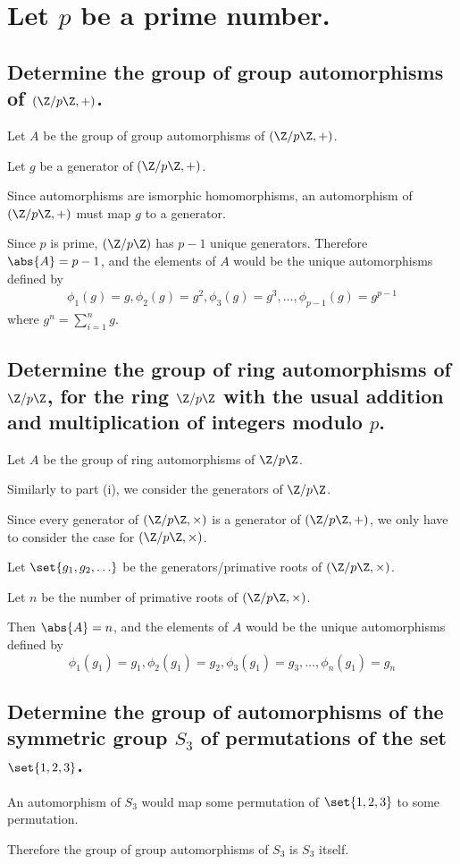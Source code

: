 \section[Problem 2]{Let $p$ be a prime number.
}  
    \subsection[(i)]{Determine the group of group automorphisms of $(\Z/p\Z, +)$.
    }
        Let $A$ be the group of group automorphisms of $(\Z/p\Z, +)$.

        Let $g$ be a generator of $(\Z/p\Z, +)$.

        Since automorphisms are ismorphic homomorphisms, an automorphism of $(\Z/p\Z, +)$ 
        must map $g$ to a generator.

        Since $p$ is prime, $(\Z/p\Z)$ has $p-1$ unique generators.
        Therefore $\abs{A} = p-1$,
        and the elements of $A$ would be the unique automorphisms defined by 
        \begin{align*}
            \phi_1(g) = g, \phi_2(g) = g^2, \phi_3(g) = g^3, \hdots, \phi_{p-1}(g) = g^{p-1}
        \end{align*}
        where $g^n = \sum_{i=1}^n g$.

    \subsection[(ii)]{Determine the group of ring automorphisms of $\Z/p\Z$, for the ring $\Z/p\Z$
        with the usual addition and multiplication of integers modulo $p$.
    }
        Let $A$ be the group of ring automorphisms of $\Z/p\Z$.

        Similarly to part (i), we consider the generators of $\Z/p\Z$.

        Since every generator of $(\Z/p\Z, \times)$ is a generator of $(\Z/p\Z, +)$,
        we only have to consider the case for $(\Z/p\Z, \times)$.

        Let $\set{g_1, g_2, \hdots}$ be the generators/primative roots of $(\Z/p\Z, \times)$.

        Let $n$ be the number of primative roots of $(\Z/p\Z, \times)$.

        Then $\abs{A} = n$, and the elements of $A$ would be the unique automorphisms defined by 
        \[
            \phi_1(g_1) = g_1, \phi_2(g_1) = g_2, \phi_3(g_1) = g_3, \hdots, \phi_{n}(g_1) = g_n
        \]

    \subsection[(iii)]{Determine the group of automorphisms of the symmetric group $S_3$ of permutations of
        the set $\set{1,2,3}$.
    }
        An automorphism of $S_3$ would map some permutation of $\set{1,2,3}$ to some permutation.

        Therefore the group of group automorphisms of $S_3$ is $S_3$ itself.